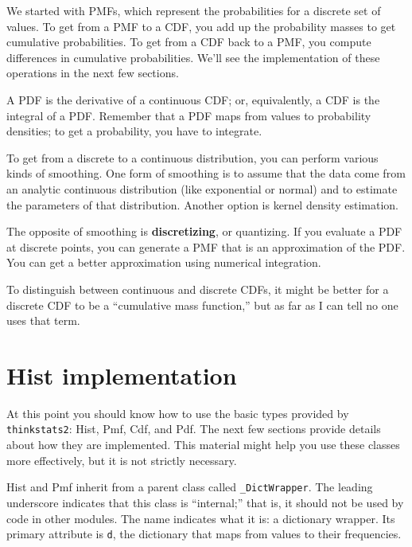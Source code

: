 \documentclass[12pt]{book}
\begin{document}
We started with PMFs, which represent the probabilities for a discrete
set of values.  To get from a PMF to a CDF, you add up the probability
masses to get cumulative probabilities.  
To get from a CDF back to a PMF, you compute differences in cumulative
probabilities.  We'll see the implementation of these operations
in the next few sections.

A PDF is the derivative of a continuous CDF; or, equivalently,
a CDF is the integral of a PDF.  Remember that a PDF maps from
values to probability densities; to get a probability, you have to
integrate.

To get from a discrete to a continuous distribution, you can perform
various kinds of smoothing.  One form of smoothing is to assume that
the data come from an analytic continuous distribution
(like exponential or normal) and to estimate the parameters of that
distribution.  Another option is kernel density estimation.

The opposite of smoothing is {\bf discretizing}, or quantizing.  If you
evaluate a PDF at discrete points, you can generate a PMF that is an
approximation of the PDF.  You can get a better approximation using
numerical integration.  

To distinguish between continuous and discrete CDFs, it might be
better for a discrete CDF to be a ``cumulative mass function,'' but as
far as I can tell no one uses that term.  



\section{Hist implementation}

At this point you should know how to use the basic types provided
by \verb"thinkstats2": Hist, Pmf, Cdf, and Pdf.  The next few sections
provide details about how they are implemented.  This material
might help you use these classes more effectively, but it is not
strictly necessary.

Hist and Pmf inherit from a parent class called \verb"_DictWrapper".
The leading underscore indicates that this class is ``internal;'' that
is, it should not be used by code in other modules.  The name
indicates what it is: a dictionary wrapper.  Its primary attribute is
\verb"d", the dictionary that maps from values to their frequencies.
\end{document}
